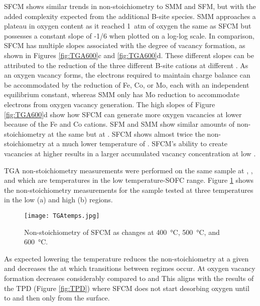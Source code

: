     SFCM shows similar trends in non-stoichiometry to SMM and SFM, but with the added complexity expected from the additional B-site species.
    SMM approaches a plateau in oxygen content as it reached \SI{1}{atm} of oxygen the same as SFCM but possesses a constant slope of -1/6 when plotted on a log-log scale.\cite{Marrero-lopez2010}
    In comparison, SFCM has multiple slopes associated with the degree of vacancy formation, as shown in Figures \ref{fig:TGA600}c and \ref{fig:TGA600}d.
    These different slopes can be attributed to the reduction of the three different B-site cations at different .
    As an oxygen vacancy forms, the electrons required to maintain charge balance can be accommodated by the reduction of Fe, Co, or Mo, each with an independent equilibrium constant, whereas SMM only has Mo reduction to accommodate electrons from oxygen vacancy generation.
    The high slopes of Figure \ref{fig:TGA600}d show how SFCM can generate more oxygen vacancies at lower  because of the Fe and Co cations.
    SFM and SMM show similar amounts of non-stoichiometry at the same  but at .\cite{Kircheisen2012}
    SFCM shows almost twice the non-stoichiometry at a much lower temperature of .
    SFCM's ability to create vacancies at higher  results in a larger accumulated vacancy concentration at low .

    TGA non-stoichiometry measurements were performed on the same sample at ,  , and  which are temperatures in the low temperature-SOFC range.
    Figure \ref{fig:TGAtemps} shows the non-stoichiometry measurements for the sample  tested at three temperatures in the low  (a) and high  (b) regions.

    \begin{figure}
      \texttt{[image: TGAtemps.jpg]}
      \caption{Non-stoichiometry of SFCM as  changes at \SI{400}{\celsius}, \SI{500}{\celsius}, and \SI{600}{\celsius}.}
      \label{fig:TGAtemps}
    \end{figure}

    As expected lowering the temperature reduces the non-stoichiometry at a given  and decreases the  at which transitions between regimes occur.
    At  oxygen vacancy formation decreases considerably compared to  and 
    This aligns with the results of the TPD (Figure \ref{fig:TPD}) where SFCM does not start desorbing oxygen until  to  and then only from the surface.

